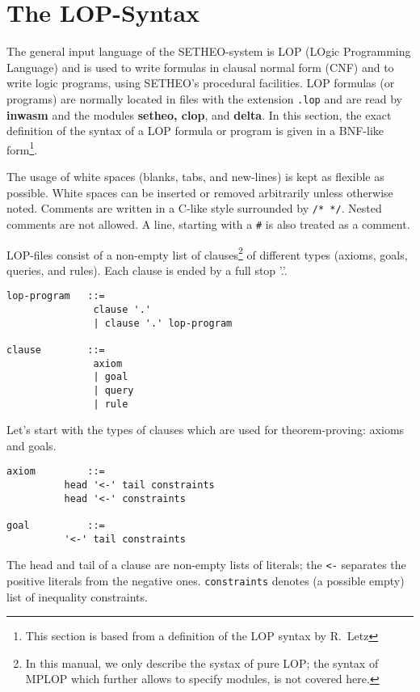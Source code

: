 %

\section{The LOP-Syntax}
\label{sec:lop-syntax}

The general input language of the SETHEO-system is
LOP (LOgic Programming Language) and is used to write
formulas in clausal normal form (CNF) and to write logic
programs, using SETHEO's procedural facilities.
LOP formulas (or programs) are normally located in files
with the extension {\tt .lop} and are read by {\bf inwasm}
and the modules {\bf setheo, clop}, and {\bf delta}.
In this section, the exact definition of the syntax of a LOP
formula or program is given in a BNF-like form\footnote{
	This section is based from a definition of the LOP
	syntax by R.~Letz
}.

The usage of white spaces (blanks, tabs, and new-lines) is
kept as flexible as possible. White spaces can be inserted or
removed arbitrarily unless otherwise noted.
Comments are written in a C-like style surrounded
by {\tt /* */}.  Nested comments are not allowed.
A line, starting with a {\tt \#} is also treated as a comment.

LOP-files consist of a non-empty list of clauses\footnote{
	In this manual, we only describe the systax of pure
	LOP; the syntax of MPLOP which further allows to specify
	modules, is not covered here.}
of different types (axioms, goals, queries, and rules).
Each clause is ended by a full stop '.'.

\begin{verbatim}
lop-program   ::=
               clause '.'
               | clause '.' lop-program

clause        ::=
               axiom
               | goal
               | query
               | rule
\end{verbatim}

Let's start with the types of clauses which are used for
theorem-proving: axioms and goals.
\begin{verbatim}
axiom         ::=
	      head '<-' tail constraints
	      head '<-' constraints

goal          ::=
	      '<-' tail constraints
\end{verbatim}
The head and tail of a clause are non-empty lists of literals;
the {\tt <-} separates the positive literals from the negative
ones.
{\tt constraints} denotes (a possible empty) list of
inequality constraints.

